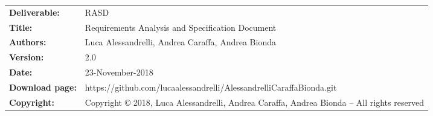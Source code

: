 \begin{table}[h!]
\begin{tabu} to \textwidth { X[0.3,r,p] X[0.7,l,p] }
\hline

\textbf{Deliverable:} & RASD\\
\textbf{Title:} & Requirements Analysis and Specification Document \\
\textbf{Authors:} & Luca Alessandrelli, Andrea Caraffa, Andrea Bionda \\
\textbf{Version:} & 2.0 \\ 
\textbf{Date:} & 23-November-2018 \\
\textbf{Download page:} & https://github.com/lucaalessandrelli/AlessandrelliCaraffaBionda.git \\
\textbf{Copyright:} & Copyright © 2018, Luca Alessandrelli, Andrea Caraffa, Andrea Bionda – All rights reserved \\
\hline
\end{tabu}
\end{table}




\setcounter{page}{2}


\newpage
{}
\tableofcontents
\newpage

\clearpage
{}
\label{sect:introduction}


\clearpage
{}
\label{sect:overview}


\clearpage
{}
\label{sect:requirements}


